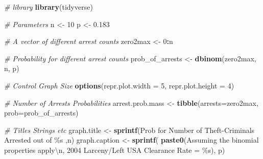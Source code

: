\documentclass[
]{book}
\newenvironment{Shaded}{\begin{snugshade}}{\end{snugshade}}
\newcommand{\CharTok}[1]{\textcolor[rgb]{0.31,0.60,0.02}{#1}}
\newcommand{\CommentTok}[1]{\textcolor[rgb]{0.56,0.35,0.01}{\textit{#1}}}
\newcommand{\DataTypeTok}[1]{\textcolor[rgb]{0.13,0.29,0.53}{#1}}
\newcommand{\DecValTok}[1]{\textcolor[rgb]{0.00,0.00,0.81}{#1}}
\newcommand{\FloatTok}[1]{\textcolor[rgb]{0.00,0.00,0.81}{#1}}
\newcommand{\KeywordTok}[1]{\textcolor[rgb]{0.13,0.29,0.53}{\textbf{#1}}}
\newcommand{\NormalTok}[1]{#1}
\newcommand{\OperatorTok}[1]{\textcolor[rgb]{0.81,0.36,0.00}{\textbf{#1}}}
\newcommand{\StringTok}[1]{\textcolor[rgb]{0.31,0.60,0.02}{#1}}
\begin{document}
\begin{Shaded}
\begin{Highlighting}[]
\CommentTok{\# library}
\KeywordTok{library}\NormalTok{(tidyverse)}

\CommentTok{\# Parameters}
\NormalTok{n \textless{}{-}}\StringTok{ }\DecValTok{10}
\NormalTok{p \textless{}{-}}\StringTok{ }\FloatTok{0.183}

\CommentTok{\# A vector of different arrest counts}
\NormalTok{zero2max \textless{}{-}}\StringTok{ }\DecValTok{0}\OperatorTok{:}\NormalTok{n}

\CommentTok{\# Probability for different arrest counts}
\NormalTok{prob\_of\_arrests \textless{}{-}}\StringTok{ }\KeywordTok{dbinom}\NormalTok{(zero2max, n, p)}

\CommentTok{\# Control Graph Size}
\KeywordTok{options}\NormalTok{(}\DataTypeTok{repr.plot.width =} \DecValTok{5}\NormalTok{, }\DataTypeTok{repr.plot.height =} \DecValTok{4}\NormalTok{)}

\CommentTok{\# Number of Arrests Probabilities}
\NormalTok{arrest.prob.mass \textless{}{-}}\StringTok{ }\KeywordTok{tibble}\NormalTok{(}\DataTypeTok{arrests=}\NormalTok{zero2max, }\DataTypeTok{prob=}\NormalTok{prob\_of\_arrests)}

\CommentTok{\# Titles Strings etc}
\NormalTok{graph.title \textless{}{-}}\StringTok{ }\KeywordTok{sprintf}\NormalTok{(}\StringTok{\textquotesingle{}Prob for Number of Theft{-}Criminals Arrested out of \%s\textquotesingle{}}\NormalTok{ ,n)}
\NormalTok{graph.caption \textless{}{-}}\StringTok{ }\KeywordTok{sprintf}\NormalTok{(}
    \KeywordTok{paste0}\NormalTok{(}\StringTok{\textquotesingle{}Assuming the binomial properties apply}\CharTok{\textbackslash{}n}\StringTok{\textquotesingle{}}\NormalTok{,}
           \StringTok{\textquotesingle{}2004 Larceny/Left USA Clearance Rate = \%s\textquotesingle{}}\NormalTok{), p)}


\end{Highlighting}
\end{Shaded}
\end{document}
